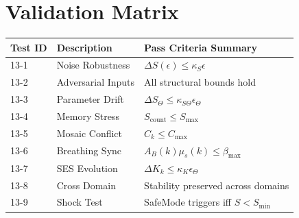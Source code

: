 
\section*{Validation Matrix}

\begin{longtable}{lll}
\toprule
\textbf{Test ID} & \textbf{Description} & \textbf{Pass Criteria Summary} \\
\midrule
13-1 & Noise Robustness & $\Delta S(\epsilon) \le \kappa_S \epsilon$ \\
13-2 & Adversarial Inputs & All structural bounds hold \\
13-3 & Parameter Drift & $\Delta S_{\Theta} \le \kappa_{S\Theta} \epsilon_{\Theta}$ \\
13-4 & Memory Stress & $S_{\text{count}} \le S_{\max}$ \\
13-5 & Mosaic Conflict & $C_k \le C_{\max}$ \\
13-6 & Breathing Sync & $A_B(k)\mu_s(k) \le \beta_{\max}$ \\
13-7 & SES Evolution & $\Delta K_k \le \kappa_K\epsilon_{\Theta}$ \\
13-8 & Cross Domain & Stability preserved across domains \\
13-9 & Shock Test & SafeMode triggers iff $S<S_{\min}$ \\
\bottomrule
\end{longtable}
